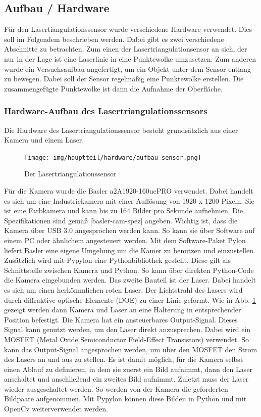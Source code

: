 	\newpage
	
	\subsection{Aufbau / Hardware}
	Für den Lasertiangulationssensor wurde verschiedene Hardware verwendet. Dies soll im Folgendem beschrieben werden. Dabei gibt es zwei verschiedene Abschnitte zu betrachten. Zum einen der Lasertriangulationsensor an sich, der nur in der Lage ist eine Laserlinie in eine Punktewolke umzusetzen. Zum anderen wurde ein Versuchsaufbau angefertigt, um ein Objekt unter dem Sensor entlang zu bewegen. Dabei soll der Sensor regelmäßig eine Punktewolke erstellen. Die zusammengefügte Punktewolke ist dann die Aufnahme der Oberfläche. 
	
		\subsubsection{Hardware-Aufbau des Lasertriangulationssensors}
		Die Hardware des Lasertriangulationssensor besteht grundsätzlich aus einer Kamera und einem Laser.
		
		\begin{figure}[h]
			\centering
			\texttt{[image: img/hauptteil/hardware/aufbau\_sensor.png]}
			\caption{Der Lasertriangulationssensor}
			\label{fig:aufbau_sensor}
		\end{figure}
		Für die Kamera wurde die Basler a2A1920-160ucPRO verwendet. Dabei handelt es sich um eine Industriekamera mit einer Auflösung von 1920 x 1200 Pixeln. Sie ist eine Farbkamera und kann bis zu 164 Bilder pro Sekunde aufnehmen. Die Spezifikationen sind gemäß [basler-cam-spez] angeben. Wichtig ist, dass die Kamera über USB 3.0 angesprochen werden kann. So kann sie über Software auf einem PC oder ähnlichem angesteuert werden. Mit dem Software-Paket Pylon liefert Basler eine eigene Umgebung um die Kamer zu benutzen und einzustellen. Zusätzlich wird mit Pypylon eine Pythonbibliothek gestellt. Diese gilt als Schnittstelle zwischen Kamera und Python. So kann über direkten Python-Code die Kamera eingebunden werden. \newline
		Das zweite Bauteil ist der Laser. Dabei handelt es sich um einen herkömmlichen roten Laser. Der Lichtstrahl des Lasers wird durch diffraktive optische Elemente (DOE) zu einer Linie geformt. Wie in Abb. \ref{fig:aufbau_sensor} gezeigt werden dann Kamera und Laser an eine Halterung in entsprechender Position befestigt. \newline
		Die Kamera hat ein ansteuerbares Output-Signal. Dieses Signal kann genutzt werden, um den Laser direkt anzusprechen. Dabei wird ein MOSFET (Metal Oxide Semiconductor Field-Effect Transistors) verwendet. So kann das Output-Signal angesprochen werden, um über den MOSFET den Strom des Lasers an und aus zu stellen. Es ist damit möglich, für die Kamera selbst einen Ablauf zu definieren, in dem sie zuerst ein Bild aufnimmt, dann den Laser anschaltet und anschließend ein zweites Bild aufnimmt. Zuletzt muss der Laser wieder ausgeschaltet werden. So werden von der Kamera die geforderten Bildpaare aufgenommen. Mit Pypylon können diese Bilden in Python und mit OpenCv weiterverwendet werden.
		
